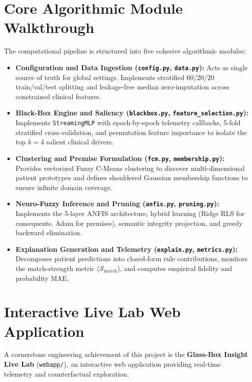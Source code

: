 \documentclass{report}
\begin{document}
\section{Core Algorithmic Module Walkthrough}

The computational pipeline is structured into five cohesive algorithmic modules:
\begin{itemize}
    \setlength{\itemsep}{0pt}
    \setlength{\parskip}{0pt}
    \item \textbf{Configuration and Data Ingestion (\texttt{config.py}, \texttt{data.py}):} Acts as single source of truth for global settings. Implements stratified 60/20/20 train/val/test splitting and leakage-free median zero-imputation across constrained clinical features.
    \item \textbf{Black-Box Engine and Saliency (\texttt{blackbox.py}, \texttt{feature\_selection.py}):} Implements \texttt{StreamingMLP} with epoch-by-epoch telemetry callbacks, 5-fold stratified cross-validation, and permutation feature importance to isolate the top $k=4$ salient clinical drivers.
    \item \textbf{Clustering and Premise Formulation (\texttt{fcm.py}, \texttt{membership.py}):} Provides vectorized Fuzzy C-Means clustering to discover multi-dimensional patient prototypes and defines shouldered Gaussian membership functions to ensure infinite domain coverage.
    \item \textbf{Neuro-Fuzzy Inference and Pruning (\texttt{anfis.py}, \texttt{pruning.py}):} Implements the 5-layer ANFIS architecture, hybrid learning (Ridge RLS for consequents, Adam for premises), semantic integrity projection, and greedy backward elimination.
    \item \textbf{Explanation Generation and Telemetry (\texttt{explain.py}, \texttt{metrics.py}):} Decomposes patient predictions into closed-form rule contributions, monitors the match-strength metric ($\mathcal{S}_{\text{match}}$), and computes empirical fidelity and probability MAE.
\end{itemize}

\section{Interactive Live Lab Web Application}

A cornerstone engineering achievement of this project is the \textbf{Glass-Box Insight Live Lab} (\texttt{webapp/}), an interactive web application providing real-time telemetry and counterfactual exploration.
\end{document}
